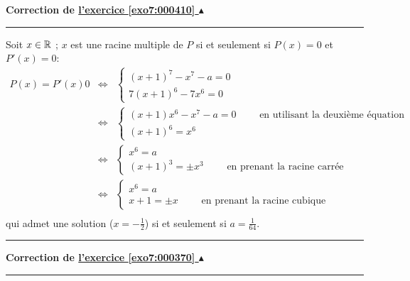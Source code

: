 \documentclass[11pt,a4paper]{article}
\newcounter{exo}
\newcommand{\correction}[1]{\hypertarget{cor7:#1}{}\label{cor7:#1}{\bf Correction de \hyperlink{exo7:#1}{l'exercice \ref{exo7:#1} $\blacktriangle$}}\vspace{1mm}\hrule\vspace{1mm}}
\newcommand{\fincorrection}{\vspace{1mm}\hrule\vspace*{7mm}}
\begin{document}
\correction{000410}
Soit $x\in\mathbb{R}$ ; $x$ est une racine multiple de $P$ si et seulement si $P(x)=0$ et $P'(x)=0$:
$$
\begin{array}{rcl}
P(x)=P'(x) 0 
&\iff& \left\{\begin{array}{l}(x+1)^7-x^7-a=0\\7(x+1)^6-7x^6=0\end{array}\right.\\
&\iff& \left\{\begin{array}{l}(x+1)x^6-x^7-a=0\qquad \text{ en utilisant la deuxième équation}\\(x+1)^6=x^6\end{array}\right.\\
&\iff& \left\{\begin{array}{l}x^6=a\\(x+1)^3=\pm x^3 \qquad \text{ en prenant la racine carrée} \end{array}\right.\\
&\iff& \left\{\begin{array}{l}x^6=a\\x+1=\pm x \qquad \text{ en prenant la racine cubique} \end{array}\right.\\
\end{array}$$
qui admet une solution ($x=-\frac{1}{2}$) si et seulement si $a=\frac{1}{64}$.
\fincorrection
\correction{000370}
\
\end{document}
